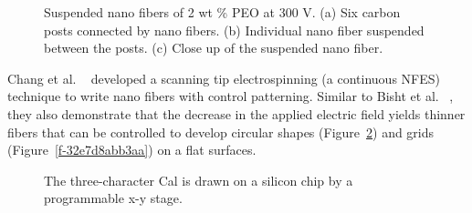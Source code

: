\documentclass[5p,,preprint,12pt,twocolumn]{elsarticle}
\makeatletter
\def\fixFloatSize#1{}%
\makeatother
\begin{document}
\bgroup
\fixFloatSize{images/55cad0f8-ee25-40e9-96e0-390553fcf271-ubisht_0.png}
\begin{figure}[!htbp]
\centering \makeatletter{}
\makeatother 
\caption{{Suspended nano fibers of 2 wt \% PEO at 300 V. (a) Six carbon posts connected by nano fibers. (b) Individual nano fiber suspended between the posts. (c) Close up of the suspended nano fiber. \unskip~\protect\cite{527120:11973130}}}
\label{f-52c94fbe4526}
\end{figure}
\egroup
Chang et al. \unskip~\cite{527120:11974306} developed a scanning tip electrospinning (a continuous NFES) technique to write nano fibers with control patterning. Similar to Bisht et al. \unskip~\cite{527120:11973130}, they also demonstrate that the decrease in the applied electric field yields thinner fibers that can be controlled to develop circular shapes (Figure~\ref{f-9d0c3125e550}) and grids (Figure~\ref{f-32e7d8abb3aa}) on a flat surfaces.


\bgroup
\fixFloatSize{images/afadfb20-d115-4170-8ccf-cb53e9d8d64d-uchang_00.png}
\begin{figure}[!htbp]
\centering \makeatletter{}
\makeatother 
\caption{{The three-character Cal is drawn on a silicon chip by a programmable x-y stage. \unskip~\protect\cite{527120:11974306}}}
\label{f-9d0c3125e550}
\end{figure}
\egroup
\end{document}
